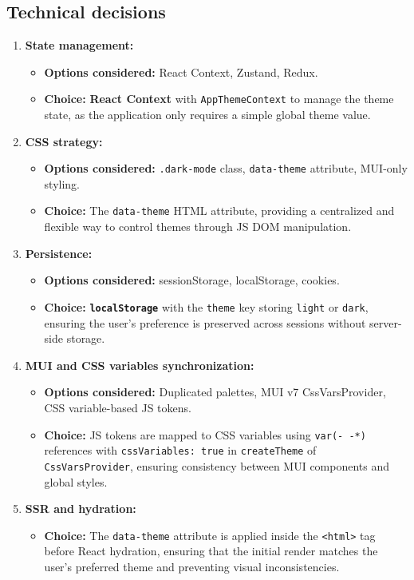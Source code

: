 \subsection{Technical decisions}

\begin{enumerate}
    \item \textbf{State management:}
    \begin{itemize}
        \item \textbf{Options considered:} React Context, Zustand, Redux.
        \item \textbf{Choice:} \textbf{React Context} with \texttt{AppThemeContext} to manage the theme state, as the application only requires a simple global theme value.
    \end{itemize}

    \item \textbf{CSS strategy:}
    \begin{itemize}
        \item \textbf{Options considered:} \texttt{.dark-mode} class, \texttt{data-theme} attribute, MUI-only styling.
        \item \textbf{Choice:} The \texttt{data-theme} \acs{HTML} attribute, providing a centralized and flexible way to control themes through \acs{JS} \acs{DOM} manipulation.
    \end{itemize}

    \item \textbf{Persistence:}
    \begin{itemize}
        \item \textbf{Options considered:} sessionStorage, localStorage, cookies.
        \item \textbf{Choice:} \textbf{\texttt{localStorage}} with the \texttt{theme} key storing \texttt{light} or \texttt{dark}, ensuring the user's preference is preserved across sessions without server-side storage.
    \end{itemize}

    \item \textbf{MUI and CSS variables synchronization:}
    \begin{itemize}
        \item \textbf{Options considered:} Duplicated palettes, MUI v7 CssVarsProvider, CSS variable-based JS tokens.
        \item \textbf{Choice:} \ac{JS} tokens are mapped to CSS variables using \texttt{var(- -*)} references with \texttt{cssVariables: true} in \texttt{createTheme} of \texttt{CssVarsProvider}, ensuring consistency between MUI components and global styles.
    \end{itemize}

    \item \textbf{SSR and hydration:}
    \begin{itemize}
        \item \textbf{Choice:} The \texttt{data-theme} attribute is applied inside the \texttt{<html>} tag before React hydration, ensuring that the initial render matches the user's preferred theme and preventing visual inconsistencies.
    \end{itemize}
\end{enumerate}

